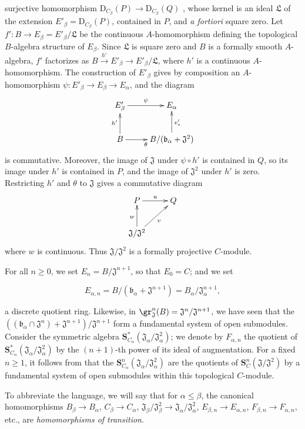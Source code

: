 \begin{env}[19.5.6.1]
surjective homomorphism
$\mathrm{D}_{C_\beta}(P)\to\mathrm{D}_{C_\beta}(Q)$ , whose
kernel is an ideal $\mathfrak{L}$ of the extension
$E'_\beta=\mathrm{D}_{C_\beta}(P)$, contained in $P$, and \emph{a fortiori}
square zero.
Let $f':B\to E_\beta=E'_\beta/\mathfrak{L}$ be the continuous $A$-homomorphism
defining the topological $B$-algebra structure of $E_\beta$.
Since $\mathfrak{L}$ is square zero and $B$ is a formally smooth $A$-algebra,
$f'$ factorizes as
$B\xrightarrow{h'}E'_\beta\to E'_\beta/\mathfrak{L}$, where $h'$ is a
continuous $A$-homomorphism.
The construction of $E'_\beta$ gives by composition an $A$-homomorphism
$\psi:E'_\beta\to E_\beta\to E_\alpha$, and the diagram
\[
  \xymatrix{
    E'_\beta \ar[r]^\psi & E_\alpha \\
    B \ar[u]^{h'} \ar[r]_\theta &
    B/(\mathfrak{b}_\alpha+\mathfrak{J}^2) \ar[u]_{v'_*}
  }
\]
is commutative.
Moreover, the image of $\mathfrak{J}$ under $\psi\circ h'$ is contained in $Q$,
so its image under $h'$ is contained in $P$, and the image of
$\mathfrak{J}^2$ under $h'$ is zero.
Restricting $h'$ and $\theta$ to $\mathfrak{J}$ gives a commutative diagram
\[
  \xymatrix{
    P \ar[r]^u & Q \\
    \mathfrak{J}/\mathfrak{J}^2 \ar[u]^w \ar[ur]_v
  }
\]
where $w$ is continuous.
Thus $\mathfrak{J}/\mathfrak{J}^2$ is a formally projective $C$-module.
\end{env}

\begin{env}[19.5.6.2]
\label{0.19.5.6.2}
For all $n\geq 0$, we set $E_n=B/\mathfrak{J}^{n+1}$, so that $E_0=C$;
and we set

\[
E_{\alpha,n}=B/(\mathfrak{b}_\alpha+\mathfrak{J}^{n+1})=B_\alpha/\mathfrak{J}_\alpha^{n+1},
\]

a discrete quotient ring.
Likewise, in $\gr_\mathfrak{J}^n(B)=\mathfrak{J}^n/\mathfrak{J}^{n+1}$, we have seen that the $((\mathfrak{b}_\alpha\cap\mathfrak{J}^n)+\mathfrak{J}^{n+1})/\mathfrak{J}^{n+1}$ form a fundamental system of open submodules.
Consider the symmetric algebra $\mathbf{S}_{C_\alpha}^*(\mathfrak{J}_\alpha/\mathfrak{J}_\alpha^2)$;
we denote by $F_{\alpha,n}$ the quotient of $\mathbf{S}_{C_\alpha}^*(\mathfrak{J}_\alpha/\mathfrak{J}_\alpha^2)$ by the $(n+1)$-th power of its ideal of augmentation.
For a fixed $n\geq 1$, it follows from  that the $\mathbf{S}_{C_\alpha}^n(\mathfrak{J}_\alpha/\mathfrak{J}_\alpha^2)$ are the quotients of $\mathbf{S}_C^n(\mathfrak{J}/\mathfrak{J}^2)$ by a fundamental system of open submodules within this topological $C$-module.

To abbreviate the language, we will say that for $\alpha\leq\beta$, the canonical homomorphisms $B_\beta\to B_\alpha$, $C_\beta\to C_\alpha$, $\mathfrak{J}_\beta/\mathfrak{J}_\beta^2\to\mathfrak{J}_\alpha/\mathfrak{J}_\alpha^2$, $E_{\beta,n}\to E_{\alpha,n}$, $F_{\beta,n}\to F_{\alpha,n}$, etc., are \emph{homomorphisms of transition}.
\end{env}

